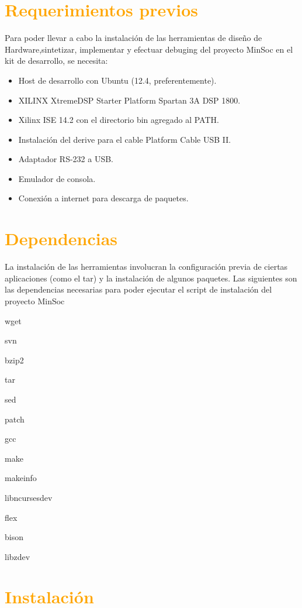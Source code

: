 \documentclass[a4paper,11pt]{article}
\begin{document}
\section{\textcolor{orange}{Requerimientos previos}}

 Para poder llevar a cabo la instalación de las herramientas de diseño de Hardware,sintetizar, implementar y efectuar debuging  del proyecto MinSoc en el kit de desarrollo, se necesita:

\begin{itemize}
\item Host de desarrollo con Ubuntu (12.4, preferentemente).
\item XILINX XtremeDSP Starter Platform Spartan 3A DSP 1800.
\item Xilinx ISE 14.2 con el directorio bin agregado al PATH.
\item Instalación del derive para el cable Platform Cable USB II.
\item Adaptador RS-232 a USB.
\item Emulador de consola.
\item Conexión a internet para descarga de paquetes.

\end{itemize} 

\newpage

\section{\textcolor{orange}{Dependencias}}

La instalación de las herramientas involucran la configuración previa de ciertas aplicaciones (como el tar) y la instalación de algunos paquetes.
Las siguientes son las dependencias necesarias para poder ejecutar el script de instalación del proyecto MinSoc

wget

svn

bzip2

tar

sed

patch

gcc

make

makeinfo

libncurses\-dev

flex

bison

libz\-dev 


 
\section{\textcolor{orange}{Instalación }}
\end{document}
